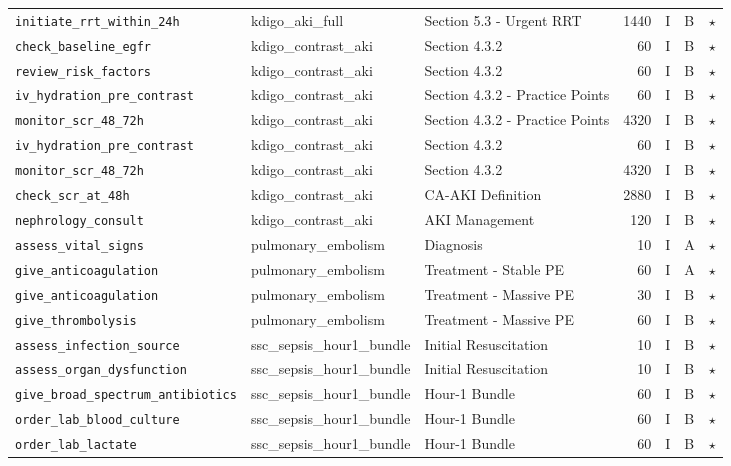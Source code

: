 \begin{longtable}{lllrcll}
\texttt{initiate\_rrt\_within\_24h} & kdigo\_aki\_full & Section 5.3 - Urgent RRT & 1440 & I & B & $\star$ \\
\texttt{check\_baseline\_egfr} & kdigo\_contrast\_aki & Section 4.3.2 & 60 & I & B & $\star$ \\
\texttt{review\_risk\_factors} & kdigo\_contrast\_aki & Section 4.3.2 & 60 & I & B & $\star$ \\
\texttt{iv\_hydration\_pre\_contrast} & kdigo\_contrast\_aki & Section 4.3.2 - Practice Points & 60 & I & B & $\star$ \\
\texttt{monitor\_scr\_48\_72h} & kdigo\_contrast\_aki & Section 4.3.2 - Practice Points & 4320 & I & B & $\star$ \\
\texttt{iv\_hydration\_pre\_contrast} & kdigo\_contrast\_aki & Section 4.3.2 & 60 & I & B & $\star$ \\
\texttt{monitor\_scr\_48\_72h} & kdigo\_contrast\_aki & Section 4.3.2 & 4320 & I & B & $\star$ \\
\texttt{check\_scr\_at\_48h} & kdigo\_contrast\_aki & CA-AKI Definition & 2880 & I & B & $\star$ \\
\texttt{nephrology\_consult} & kdigo\_contrast\_aki & AKI Management & 120 & I & B & $\star$ \\
\texttt{assess\_vital\_signs} & pulmonary\_embolism & Diagnosis & 10 & I & A & $\star$ \\
\texttt{give\_anticoagulation} & pulmonary\_embolism & Treatment - Stable PE & 60 & I & A & $\star$ \\
\texttt{give\_anticoagulation} & pulmonary\_embolism & Treatment - Massive PE & 30 & I & B & $\star$ \\
\texttt{give\_thrombolysis} & pulmonary\_embolism & Treatment - Massive PE & 60 & I & B & $\star$ \\
\texttt{assess\_infection\_source} & ssc\_sepsis\_hour1\_bundle & Initial Resuscitation & 10 & I & B & $\star$ \\
\texttt{assess\_organ\_dysfunction} & ssc\_sepsis\_hour1\_bundle & Initial Resuscitation & 10 & I & B & $\star$ \\
\texttt{give\_broad\_spectrum\_antibiotics} & ssc\_sepsis\_hour1\_bundle & Hour-1 Bundle & 60 & I & B & $\star$ \\
\texttt{order\_lab\_blood\_culture} & ssc\_sepsis\_hour1\_bundle & Hour-1 Bundle & 60 & I & B & $\star$ \\
\texttt{order\_lab\_lactate} & ssc\_sepsis\_hour1\_bundle & Hour-1 Bundle & 60 & I & B & $\star$ \\

\end{longtable}
